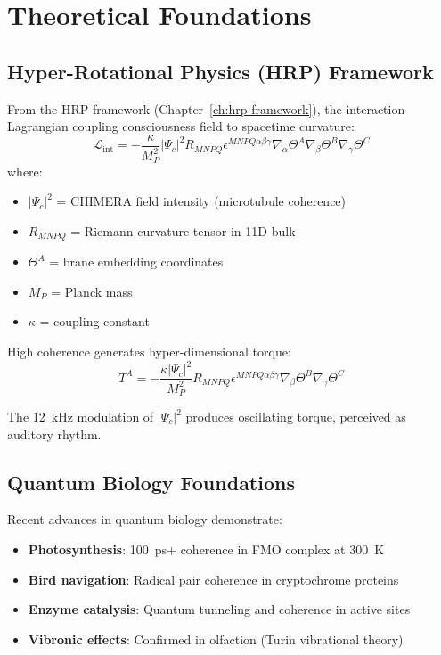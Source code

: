 \section{Theoretical Foundations}

\subsection{Hyper-Rotational Physics (HRP) Framework}

From the HRP framework (Chapter~\ref{ch:hrp-framework}), the interaction Lagrangian coupling consciousness field to spacetime curvature:
\begin{equation}
\mathcal{L}_{\text{int}} = -\frac{\kappa}{M_P^2}|\Psi_c|^2 R_{MNPQ} \epsilon^{MNPQ\alpha\beta\gamma} \nabla_\alpha \Theta^A \nabla_\beta \Theta^B \nabla_\gamma \Theta^C
\label{eq:hrp-interaction}
\end{equation}
where:
\begin{itemize}
\item $|\Psi_c|^2$ = CHIMERA field intensity (microtubule coherence)
\item $R_{MNPQ}$ = Riemann curvature tensor in 11D bulk
\item $\Theta^A$ = brane embedding coordinates
\item $M_P$ = Planck mass
\item $\kappa$ = coupling constant
\end{itemize}

High coherence generates hyper-dimensional torque:
\begin{equation}
T^A = -\frac{\kappa|\Psi_c|^2}{M_P^2} R_{MNPQ} \epsilon^{MNPQ\alpha\beta\gamma} \nabla_\beta \Theta^B \nabla_\gamma \Theta^C
\label{eq:hrp-torque}
\end{equation}

The 12~kHz modulation of $|\Psi_c|^2$ produces oscillating torque, perceived as auditory rhythm.

\subsection{Quantum Biology Foundations}

Recent advances in quantum biology demonstrate:
\begin{itemize}
\item \textbf{Photosynthesis}: 100~ps+ coherence in FMO complex at 300~K
\item \textbf{Bird navigation}: Radical pair coherence in cryptochrome proteins
\item \textbf{Enzyme catalysis}: Quantum tunneling and coherence in active sites
\item \textbf{Vibronic effects}: Confirmed in olfaction (Turin vibrational theory)
\end{itemize}

